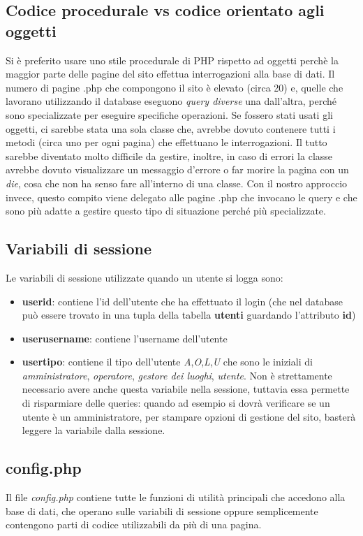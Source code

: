 \documentclass[10pt, a4paper]{article}
\begin{document}
\subsection{Codice procedurale vs codice orientato agli oggetti}
Si è preferito usare uno stile procedurale di PHP rispetto ad oggetti perchè
la maggior parte delle pagine del sito effettua interrogazioni alla base di dati.
Il numero di pagine .php che compongono il sito è elevato (circa 20) e, quelle che
lavorano utilizzando il database eseguono \emph{query diverse} una dall'altra, perché
sono specializzate per eseguire specifiche operazioni.
Se fossero stati usati gli oggetti, ci sarebbe stata una sola classe che, avrebbe dovuto
contenere tutti i metodi (circa uno per ogni pagina) che effettuano le interrogazioni. Il
tutto sarebbe diventato molto difficile da gestire, inoltre, in caso di errori la
classe avrebbe dovuto visualizzare un messaggio d'errore o far morire la pagina con un
\emph{die}, cosa che non ha senso fare all'interno di una classe. Con il nostro approccio invece, questo compito viene delegato alle pagine .php
che invocano le query e che sono più adatte a gestire questo tipo di situazione perché più specializzate.


\subsection{Variabili di sessione}
Le variabili di sessione utilizzate quando un utente si logga sono:
\begin{itemize}
  \item{\textbf{user\textunderscore id}: contiene l'id dell'utente che ha effettuato il
    login (che nel database può essere trovato in una tupla della tabella \textbf{utenti}
    guardando l'attributo \textbf{id})}
  \item{\textbf{user\textunderscore username}: contiene l'username dell'utente}
  \item{\textbf{user\textunderscore tipo}: contiene il tipo dell'utente
    \emph{A},\emph{O},\emph{L},\emph{U} che sono le iniziali di 
    \emph{amministratore}, \emph{operatore}, \emph{gestore dei luoghi}, \emph{utente}}. Non è strettamente necessario avere anche questa variabile nella sessione, tuttavia essa permette di risparmiare delle queries: quando ad esempio si dovrà verificare se un utente è un amministratore, per stampare opzioni di gestione del sito, basterà leggere la variabile dalla sessione.
\end{itemize}

\subsection{config.php}
Il file \textit{config.php} contiene tutte le funzioni di utilità principali che
accedono alla base di dati, che operano sulle variabili di sessione oppure semplicemente contengono parti di codice utilizzabili da più di una pagina.
\end{document}
